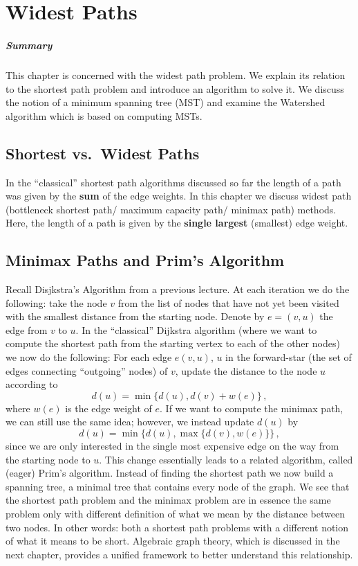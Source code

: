 \setcounter{chapter}{7}
\chapter{Widest Paths}%
\label{chap:08}

\paragraph{Summary}
This chapter is concerned with the widest path problem. We explain its relation
to the shortest path problem and introduce an algorithm to solve it. We discuss
the notion of a minimum spanning tree (MST) and examine the Watershed algorithm
which is based on computing MSTs.

\setcounter{section}{1}
\section{Shortest vs.\ Widest Paths}
In the ``classical'' shortest path algorithms discussed so far the length of a
path was given by the \textbf{sum} of the edge weights. In this chapter we
discuss widest path (bottleneck shortest path/ maximum capacity path/ minimax
path) methods.  Here, the length of a path is given by the \textbf{single
  largest} (smallest) edge weight.

\section{Minimax Paths and Prim's Algorithm}
Recall Disjkstra's Algorithm from a previous lecture. At each iteration we do
the following: take the node $v$ from the list of nodes that have not yet been
visited with the smallest distance from the starting node. Denote by $e = (v,u)$
the edge from $v$ to $u$.  In the ``classical'' Dijkstra algorithm (where we
want to compute the shortest path from the starting vertex to each of the other
nodes) we now do the following: For each edge $e(v,u)$, $u$ in the forward-star
(\ie the set of edges connecting ``outgoing'' nodes) of $v$, update the distance
to the node $u$ according to
\begin{equation*}
  d(u) = \min\{d(u), d(v) + w(e) \}\,,
\end{equation*}
where $w(e)$ is the edge weight of $e$. If we want to compute the minimax path,
we can still use the same idea; however, we instead update $d(u)$ by
\begin{equation*}
  d(u) = \min\{d(u), \max\{ d(v), w(e) \}\}\,,
\end{equation*}
since we are only interested in the single most expensive edge on the way from
the starting node to $u$. This change essentially leads to a related algorithm,
called (eager) Prim's algorithm. Instead of finding the shortest path we now
build a spanning tree, \ie a minimal tree that contains every node of the
graph. We see that the shortest path problem and the minimax problem are in
essence the same problem only with different definition of what we mean by the
distance between two nodes. In other words: both a shortest path problems with a
different notion of what it means to be short. Algebraic graph theory, which is
discussed in the next chapter, provides a unified framework to better understand
this relationship.

